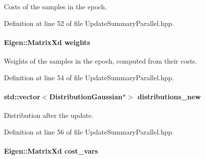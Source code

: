 Costs of the samples in the epoch. 



Definition at line 52 of file Update\+Summary\+Parallel.\+hpp.

\hypertarget{classDmpBbo_1_1UpdateSummaryParallel_a16d226260adc0af72c89783c656d25d5}{
\paragraph[{weights}]{\setlength{\rightskip}{0pt plus 5cm}Eigen\+::\+Matrix\+Xd weights}}\label{classDmpBbo_1_1UpdateSummaryParallel_a16d226260adc0af72c89783c656d25d5}


Weights of the samples in the epoch, computed from their costs. 



Definition at line 54 of file Update\+Summary\+Parallel.\+hpp.

\hypertarget{classDmpBbo_1_1UpdateSummaryParallel_a4c6413f2fad88cc0c4addb3f2a2ef298}{
\paragraph[{distributions\+\_\+new}]{\setlength{\rightskip}{0pt plus 5cm}std\+::vector$<${\bf Distribution\+Gaussian}$\ast$$>$ distributions\+\_\+new}}\label{classDmpBbo_1_1UpdateSummaryParallel_a4c6413f2fad88cc0c4addb3f2a2ef298}


Distribution after the update. 



Definition at line 56 of file Update\+Summary\+Parallel.\+hpp.

\hypertarget{classDmpBbo_1_1UpdateSummaryParallel_ab6057150915c96b1d20ed485a1f5ce18}{
\paragraph[{cost\+\_\+vars}]{\setlength{\rightskip}{0pt plus 5cm}Eigen\+::\+Matrix\+Xd cost\+\_\+vars}}\label{classDmpBbo_1_1UpdateSummaryParallel_ab6057150915c96b1d20ed485a1f5ce18}


